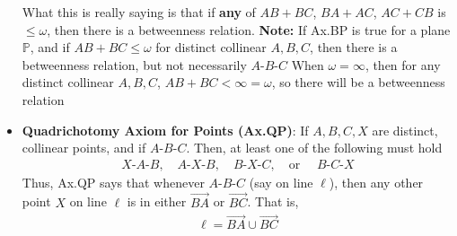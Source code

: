 \documentclass{report}
\begin{document}
\begin{itemize}
        \bigbreak \noindent 
        What this is really saying is that if \textbf{any} of $AB + BC$, $BA + AC$, $AC + CB$ is $ \leq \omega$, then there is a betweenness relation.
        \bigbreak \noindent 
        \textbf{Note:} If Ax.BP is true for a plane $\mathbb{P}$, and if $AB + BC \leq \omega$ for distinct collinear $A,B,C$, then there is a betweenness relation, but not necessarily $ A\text{-}B\text{-}C $
        \bigbreak \noindent 
        When $\omega = \infty$, then for any distinct collinear $A,B,C$, $AB +BC  < \infty = \omega $, so there will be a betweenness relation
    \item \textbf{Quadrichotomy Axiom for Points (Ax.QP)}: If $A,B,C,X$ are distinct, collinear points, and if $ A\text{-}B\text{-}C$. Then, at least one of the following must hold
        \begin{align*}
            X\text{-}A\text{-}B, \quad A\text{-}X\text{-}B, \quad B\text{-}X\text{-}C, \quad \text{or } \quad B\text{-}C\text{-}X
        \end{align*}
        \bigbreak \noindent 
        Thus, Ax.QP says that whenever $ A\text{-}B\text{-}C$ (say on line $\ell$), then any other point $X$ on line $\ell$ is in either $ \overrightarrow{BA} $ or $ \overrightarrow{BC} $. That is,
        \begin{align*}
            \ell = \overrightarrow{BA} \cup \overrightarrow{BC}
        \end{align*}


\end{itemize}
\end{document}
